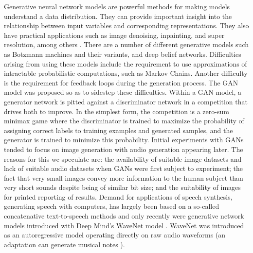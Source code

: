 \documentclass[a4paper, dvipsnames, titlepage]{article}
\begin{document}
Generative neural network models are powerful methods for making models understand a data distribution.
They can provide important insight into the relationship between input variables and corresponding representations.
They also have practical applications such as image denoising, inpainting, and super resolution, among others \citep{openai_blog_2017}.
\newline
\newline
There are a number of different generative models such as Botzmann machines and their variants, and deep belief networks.
Difficulties arising from using these models include the requirement to use approximations of intractable probabilistic computations, such as Markov Chains.
Another difficulty is the requirement for feedback loops during the generation process.
The GAN model was proposed so as to sidestep these difficulties.
\newline
\newline
Within a GAN model, a generator network is pitted against a discriminator network in a competition that drives both to improve.
In the simplest form, the competition is a zero-sum minimax game where the discriminator is trained to maximize the probability of assigning correct labels to training examples and generated samples, and the generator is trained to minimize this probability.
\newline
\newline
Initial experiments with GANs tended to focus on image generation with audio generation appearing later.
The reasons for this we speculate are: the availability of suitable image datasets and lack of suitable audio datasets when GANs were first subject to experiment; the fact that very small images convey more information to the human subject than very short sounds despite being of similar bit size; and the suitability of images for printed reporting of results.
\newline
\newline
Demand for applications of speech synthesis, generating speech with computers, has largely been based on a so-called concatenative text-to-speech methods and only recently were generative network models introduced with Deep Mind's WaveNet model \citep{waveNetUrl}.
WaveNet was introduced as an autoregressive model operating directly on raw audio waveforms \citep{DBLP:journals/corr/OordDZSVGKSK16} (an adaptation can generate musical notes \citep{2017arXiv170401279E}).
\newline
\newline
\end{document}
